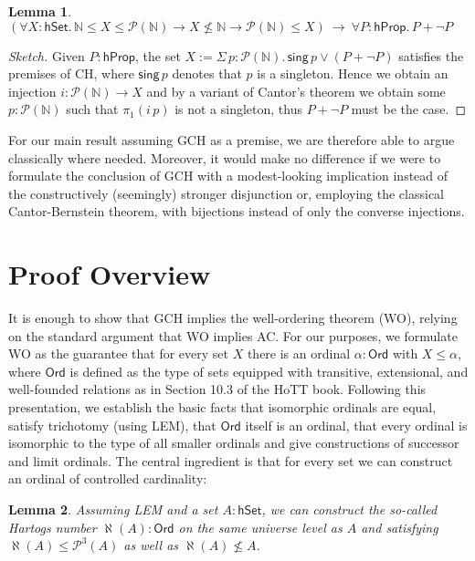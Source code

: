 \documentclass{easychair}
\newcommand{\nat}{\mathbb{N}}
\newcommand{\pow}{\mathcal{P}}
\newcommand{\hprop}{\mathsf{hProp}}
\newcommand{\hset}{\mathsf{hSet}}
\newcommand{\Ord}{\mathsf{Ord}}
\newtheorem{lemma}{Lemma}
\begin{document}
\begin{lemma}
	$(\forall X:\hset.\,\nat \le X\le \pow(\nat)\to X\not\le \nat\to \pow(\nat)\le X)~\to~\forall P:\hprop.\,P+\neg P$
\end{lemma}
\begin{proof}[Sketch]
	Given $P:\hprop$, the set $X:=\Sigma\, p:\pow(\nat).\,\mathsf{sing}\,p\lor (P+\neg P)$ satisfies the premises of CH, where $\mathsf{sing}\,p$ denotes that $p$ is a singleton.
	Hence we obtain an injection $i:\pow(\nat)\to X$ and by a variant of Cantor's theorem we obtain some $p:\pow(\nat)$ such that $\pi_1(i\,p)$ is not a singleton, thus $P+\neg P$ must be the case.
\end{proof}

For our main result assuming GCH as a premise, we are therefore able to argue classically where needed.
Moreover, it would make no difference if we were to formulate the conclusion of GCH with a modest-looking implication instead of the constructively (seemingly) stronger disjunction or, employing the classical Cantor-Bernstein theorem, with bijections instead of only the converse injections.




\section{Proof Overview}

It is enough to show that GCH implies the well-ordering theorem (WO), relying on the standard argument that WO implies AC.
For our purposes, we formulate WO as the guarantee that for every set $X$ there is an ordinal $\alpha:\Ord$ with $X\le \alpha$, where $\Ord$ is defined as the type of sets equipped with transitive, extensional, and well-founded relations as in Section 10.3 of the HoTT book.
Following this presentation, we establish the basic facts that isomorphic ordinals are equal, satisfy trichotomy (using LEM), that $\Ord$ itself is an ordinal, that every ordinal is isomorphic to the type of all smaller ordinals and give constructions of successor and limit ordinals.
The central ingredient is that for every set we can construct an ordinal of controlled cardinality:

\newpage

\begin{lemma}
	\label{hartogs}
	Assuming LEM and a set $A:\hset$, we can construct the so-called \emph{Hartogs number} $\aleph(A):\Ord$ on the same universe level as $A$ and satisfying $\aleph(A)\le\pow^3(A)$ as well as $\aleph(A)\not\le A$.
\end{lemma}
\end{document}
